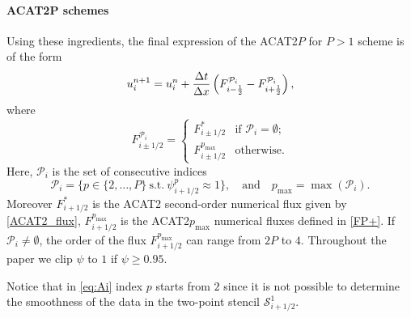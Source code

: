 \paragraph{ACAT2P schemes}
Using these ingredients, the final expression of the ACAT2$P$ for $P>1$ scheme is of the form
\begin{equation}
    \label{ACAT2P}
u_i^{n+1} = u_i^n + \frac{\Delta t}{\Delta x} \left({F}^{\mathcal{P}_i}_{i-\frac{1}{2}} - 
      {F}^{\mathcal{P}_i}_{i+\frac{1}{2}} \right),
\end{equation}  
where
\begin{equation}\label{numfluxacat}
    {F}^{\mathcal{P}_i}_{i\pm1/2} = \begin{cases}
    {F}^{*}_{i\pm1/2} & \text{if $\mathcal{P}_i = \emptyset$;}\\
    {F}^{p_{\max}}_{i\pm1/2} & \text{otherwise.}
    \end{cases}
\end{equation}
Here, $\mathcal{P}_i$ is the set of consecutive indices 
    \begin{equation}
    \mathcal{P}_i= \{  p \in \{2, \dots, P \} \ \text{s.t.}\  \psi^p_{i+ 1/2} \approx 1 \},
    \quad \text{and}    \quad
    p_{\max} = \max(\mathcal{P}_i).
    \label{eq:Ai}
\end{equation}
Moreover $F^*_{i+1/2}$ is the ACAT2 second-order numerical flux given by \eqref{ACAT2_flux}, $F^{p_{\max}}_{i+1/2}$ is the ACAT2$p_{\max}$ numerical fluxes defined in \eqref{FP+}. 
If $\mathcal{P}_i \not= \emptyset$, the order of the flux $F^{p_{\max}}_{i+1/2}$ can range from $2P$ to $4$.
Throughout the paper we clip $\psi$ to $1$ if $\psi\geq 0.95$.
\begin{rem}
Notice that in \eqref{eq:Ai} index $p$ starts from $2$ since it is not possible to determine the smoothness of the data in the two-point stencil $\mathcal{S}^1_{i+1/2}$.
\end{rem}


